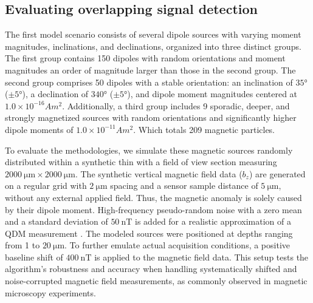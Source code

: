 \subsection{Evaluating overlapping signal detection}
\label{sec:synthetic-overlapping}

The first model scenario consists of several dipole sources with varying moment magnitudes, inclinations, and declinations, organized into three distinct groups. The first group contains 150 dipoles with random orientations and moment magnitudes an order of magnitude larger than those in the second group. The second group comprises 50 dipoles with a stable orientation: an inclination of \(\ang{35}\) (\(\pm \ang{5}\)), a declination of \(\ang{340}\) (\(\pm \ang{5}\)), and dipole moment magnitudes centered at \(1.0 \times 10^{-16} Am^2\). Additionally, a third group includes 9 sporadic, deeper, and strongly magnetized sources with random orientations and significantly higher dipole moments of \(1.0 \times 10^{-11} Am^2\). Which totals 209 magnetic particles.

To evaluate the methodologies, we simulate these magnetic sources randomly distributed within a synthetic thin with a field of view section measuring \(\qty{2000}{\micro\meter} \times \qty{2000}{\micro\meter}\). The synthetic vertical magnetic field data (\(b_z\)) are generated on a regular grid with \(\qty{2}{\micro\meter}\) spacing and a sensor sample distance of \(\qty{5}{\micro\meter}\), without any external applied field. Thus, the magnetic anomaly is solely caused by their dipole moment. High-frequency pseudo-random noise with a zero mean and a standard deviation of \(\qty{50}{\nano\tesla}\) is added for a realistic approximation of a QDM measurement \citep{Glenn2017}. The modeled sources were positioned at depths ranging from 1 to \(\qty{20}{\micro\meter}\). To further emulate actual acquisition conditions, a positive baseline shift of \(\qty{400}{\nano\tesla}\) is applied to the magnetic field data. This setup tests the algorithm's robustness and accuracy when handling systematically shifted and noise-corrupted magnetic field measurements, as commonly observed in magnetic microscopy experiments.

